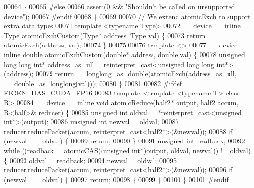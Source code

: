 \begin{DoxyCode}
00064   \}
00065 \textcolor{preprocessor}{#else}
00066   assert(0 && \textcolor{stringliteral}{"Shouldn't be called on unsupported device"});
00067 \textcolor{preprocessor}{#endif}
00068 \}
00069 
00070 \textcolor{comment}{// We extend atomicExch to support extra data types}
00071 \textcolor{keyword}{template} <\textcolor{keyword}{typename} Type>
00072 \_\_device\_\_ \textcolor{keyword}{inline} Type atomicExchCustom(Type* address, Type val) \{
00073   \textcolor{keywordflow}{return} atomicExch(address, val);
00074 \}
00075 
00076 \textcolor{keyword}{template} <>
00077 \_\_device\_\_ \textcolor{keyword}{inline} \textcolor{keywordtype}{double} atomicExchCustom(\textcolor{keywordtype}{double}* address, \textcolor{keywordtype}{double} val) \{
00078   \textcolor{keywordtype}{unsigned} \textcolor{keywordtype}{long} \textcolor{keywordtype}{long} \textcolor{keywordtype}{int}* address\_as\_ull = \textcolor{keyword}{reinterpret\_cast<}\textcolor{keywordtype}{unsigned} \textcolor{keywordtype}{long} \textcolor{keywordtype}{long} \textcolor{keywordtype}{int}*\textcolor{keyword}{>}(address);
00079   \textcolor{keywordflow}{return} \_\_longlong\_as\_double(atomicExch(address\_as\_ull, \_\_double\_as\_longlong(val)));
00080 \}
00081 
00082 \textcolor{preprocessor}{#ifdef EIGEN\_HAS\_CUDA\_FP16}
00083 \textcolor{keyword}{template} <\textcolor{keyword}{template} <\textcolor{keyword}{typename} T> \textcolor{keyword}{class }R>
00084 \_\_device\_\_ \textcolor{keyword}{inline} \textcolor{keywordtype}{void} atomicReduce(half2* output, half2 accum, R<half>& reducer) \{
00085   \textcolor{keywordtype}{unsigned} \textcolor{keywordtype}{int} oldval = *\textcolor{keyword}{reinterpret\_cast<}\textcolor{keywordtype}{unsigned} \textcolor{keywordtype}{int}*\textcolor{keyword}{>}(output);
00086   \textcolor{keywordtype}{unsigned} \textcolor{keywordtype}{int} newval = oldval;
00087   reducer.reducePacket(accum, reinterpret\_cast<half2*>(&newval));
00088   \textcolor{keywordflow}{if} (newval == oldval) \{
00089     \textcolor{keywordflow}{return};
00090   \}
00091   \textcolor{keywordtype}{unsigned} \textcolor{keywordtype}{int} readback;
00092   \textcolor{keywordflow}{while} ((readback = atomicCAS((\textcolor{keywordtype}{unsigned} \textcolor{keywordtype}{int}*)output, oldval, newval)) != oldval) \{
00093     oldval = readback;
00094     newval = oldval;
00095     reducer.reducePacket(accum, reinterpret\_cast<half2*>(&newval));
00096     \textcolor{keywordflow}{if} (newval == oldval) \{
00097       \textcolor{keywordflow}{return};
00098     \}
00099   \}
00100 \}
00101 \textcolor{preprocessor}{#endif}

\end{DoxyCode}
